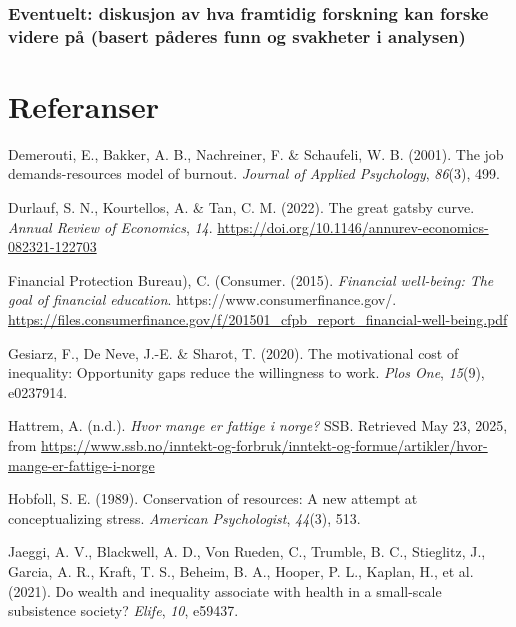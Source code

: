 \documentclass[
  12pt,
  a4paper,
  DIV=11,
  numbers=noendperiod]{scrartcl}
\newlength{\cslhangindent}
\newenvironment{CSLReferences}[2] %
 {\begin{list}{}{%
  \setlength{\itemindent}{0pt}
  \setlength{\leftmargin}{0pt}
  \setlength{\parsep}{0pt}
  \ifodd #1
   \setlength{\leftmargin}{\cslhangindent}
   \setlength{\itemindent}{-1\cslhangindent}
  \fi
  \setlength{\itemsep}{#2\baselineskip}}}
 {\end{list}}
\begin{document}
\subsubsection{Eventuelt: diskusjon av hva framtidig forskning kan
forske videre på (basert påderes funn og svakheter i
analysen)}\label{eventuelt-diskusjon-av-hva-framtidig-forskning-kan-forske-videre-puxe5-basert-puxe5deres-funn-og-svakheter-i-analysen}

\newpage

\section*{Referanser}\label{referanser}

\label{refs}
\begin{CSLReferences}{1}{0}
Demerouti, E., Bakker, A. B., Nachreiner, F. \& Schaufeli, W. B. (2001).
The job demands-resources model of burnout. \emph{Journal of Applied
Psychology}, \emph{86}(3), 499.

Durlauf, S. N., Kourtellos, A. \& Tan, C. M. (2022). The great gatsby
curve. \emph{Annual Review of Economics}, \emph{14}.
\url{https://doi.org/10.1146/annurev-economics-082321-122703}

Financial Protection Bureau), C. (Consumer. (2015). \emph{Financial
well-being: The goal of financial education}.
https://www.consumerfinance.gov/.
\url{https://files.consumerfinance.gov/f/201501_cfpb_report_financial-well-being.pdf}

Gesiarz, F., De Neve, J.-E. \& Sharot, T. (2020). The motivational cost
of inequality: Opportunity gaps reduce the willingness to work.
\emph{Plos One}, \emph{15}(9), e0237914.

Hattrem, A. (n.d.). \emph{Hvor mange er fattige i norge?} SSB. Retrieved
May 23, 2025, from
\url{https://www.ssb.no/inntekt-og-forbruk/inntekt-og-formue/artikler/hvor-mange-er-fattige-i-norge}

Hobfoll, S. E. (1989). Conservation of resources: A new attempt at
conceptualizing stress. \emph{American Psychologist}, \emph{44}(3), 513.

Jaeggi, A. V., Blackwell, A. D., Von Rueden, C., Trumble, B. C.,
Stieglitz, J., Garcia, A. R., Kraft, T. S., Beheim, B. A., Hooper, P.
L., Kaplan, H., et al. (2021). Do wealth and inequality associate with
health in a small-scale subsistence society? \emph{Elife}, \emph{10},
e59437.


\end{CSLReferences}
\end{document}
